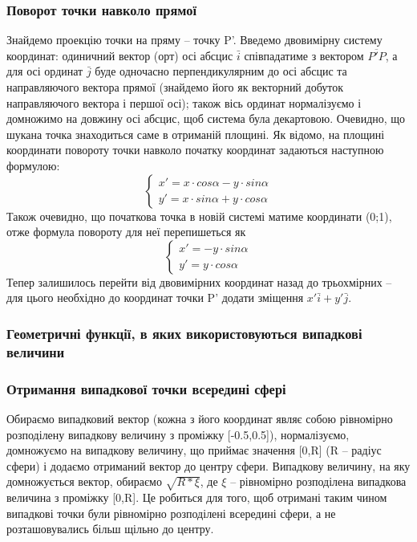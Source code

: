 \documentclass[a4paper,12pt]{article}
\begin{document}
\subsubsection{Поворот точки навколо прямої}
Знайдемо проекцію точки на пряму -- точку P'. Введемо двовимірну систему координат: одиничний вектор (орт) осі абсцис $\bar i$ співпадатиме з вектором $\overline{P'P}$, а для осі ординат $\bar j$ буде одночасно перпендикулярним до осі абсцис та направляючого вектора прямої (знайдемо його як векторний добуток направляючого вектора і першої осі); також вісь ординат нормалізуємо і домножимо на довжину осі абсцис, щоб система була декартовою. Очевидно, що шукана точка знаходиться саме в отриманій площині. Як відомо, на площині координати повороту точки навколо початку координат задаються наступною формулою:
\[
  \begin{cases}
    x' = x \cdot cos \alpha - y \cdot sin \alpha \\
    y' = x \cdot sin \alpha + y \cdot cos \alpha
  \end{cases}
\]
 Також очевидно, що початкова точка в новій системі матиме координати (0;1), отже формула повороту для неї перепишеться як
\[
  \begin{cases}
    x' = - y \cdot sin \alpha \\
    y' = y \cdot cos \alpha
  \end{cases}
\]
Тепер залишилось перейти від двовимірних координат назад до трьохмірних -- для цього необхідно до координат точки P' додати зміщення $x' \bar i + y' \bar j$.

\subsubsection{Геометричні функції, в яких використовуються випадкові величини}
\subsubsection*{Отримання випадкової точки всередині сфері}

Обираємо випадковий вектор (кожна з його координат являє собою рівномірно розподілену випадкову величину з проміжку [-0.5,0.5]), нормалізуємо, домножуємо на випадкову величину, що приймає значення [0,R] (R -- радіус сфери) і додаємо отриманий вектор до центру сфери. Випадкову величину, на яку домножується вектор, обираємо $\sqrt{R*\xi}$, де $\xi$ -- рівномірно розподілена випадкова величина з проміжку [0,R]. Це робиться для того, щоб отримані таким чином випадкові точки були рівномірно розподілені всередині сфери, а не розташовувались більш щільно до центру.
\end{document}
